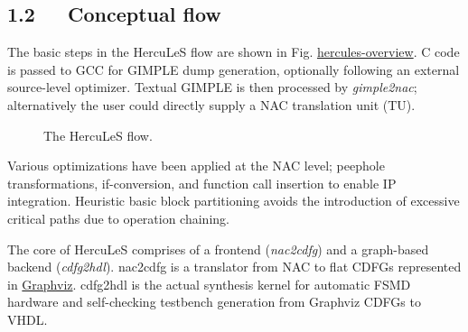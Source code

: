\documentclass[a4paper]{article}
\begin{document}
\subsection{1.2~~~Conceptual flow%
  \label{conceptual-flow}%
}

The basic steps in the HercuLeS flow are shown in Fig. \hyperref[hercules-overview]{hercules-overview}.
C code is passed to GCC for GIMPLE dump generation, optionally following an
external source-level optimizer. Textual GIMPLE is then processed by
\emph{gimple2nac}; alternatively the user could directly supply a NAC translation
unit (TU).
\begin{figure}
\label{hercules-overview}
\noindent{}
\caption{The HercuLeS flow.}
\end{figure}

Various optimizations have been applied at the NAC level; peephole
transformations, if-conversion, and function call insertion to enable IP
integration. Heuristic basic block partitioning avoids the introduction of
excessive critical paths due to operation chaining.

The core of HercuLeS comprises of a frontend (\emph{nac2cdfg}) and a graph-based
backend (\emph{cdfg2hdl}). nac2cdfg is a translator from NAC to flat CDFGs
represented in \href{http://www.graphviz.org}{Graphviz}. cdfg2hdl is the actual synthesis kernel for
automatic FSMD hardware and self-checking testbench generation from Graphviz
CDFGs to VHDL.
\end{document}
